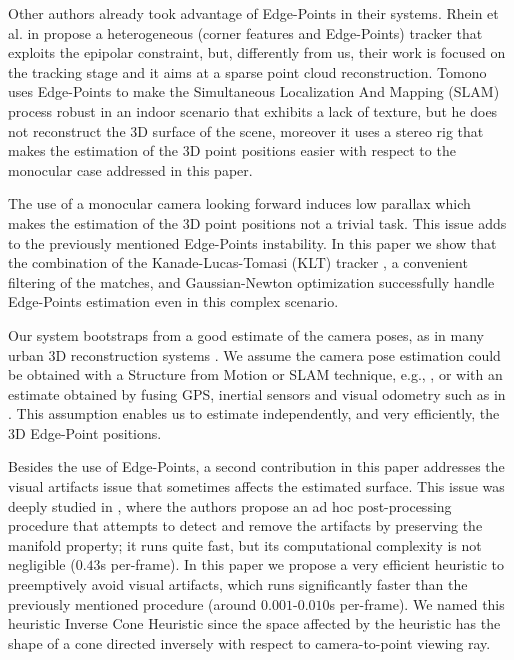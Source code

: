 Other authors \cite{Rhein_et_al13, Tomono09} already took advantage of Edge-Points in their systems. Rhein et al. in \cite{Rhein_et_al13} propose a heterogeneous (corner features and Edge-Points) tracker that exploits the epipolar constraint, but, differently from us, their work is focused on the tracking stage and it aims at a sparse point cloud reconstruction.
Tomono \cite{Tomono09}  uses Edge-Points to make  the Simultaneous Localization And Mapping (SLAM) process robust in an indoor scenario that exhibits a lack of texture, but he does not reconstruct the 3D surface of the scene, moreover it uses a stereo rig that makes the estimation of the 3D point positions easier with respect to the monocular case addressed in this paper.

The use of a monocular camera looking forward induces low parallax which makes  the estimation of the 3D point positions not a trivial task. This issue adds to the previously mentioned Edge-Points instability. 
In this paper we show that the combination of the  Kanade-Lucas-Tomasi (KLT) tracker \cite{Lucas_Kanade81}, a convenient filtering of the matches, and Gaussian-Newton optimization successfully handle Edge-Points estimation even in this complex scenario. 

Our system bootstraps from a good estimate of the camera poses, as in many urban 3D reconstruction systems \cite{ pollefeys_et_al_08, Cornelis_et_al08}. 
We assume the camera pose estimation could be obtained with a Structure from Motion or SLAM technique, e.g., \cite{Snavely_et_al06},  or with an estimate obtained by fusing GPS, inertial sensors and visual odometry such as in \cite{Cucci_Matteucci14}.
This assumption enables us to estimate independently, and very efficiently, the 3D Edge-Point positions.

Besides the use of Edge-Points, a second contribution in this paper addresses the visual artifacts issue that sometimes affects the estimated surface.
This issue was deeply studied in \cite{litvinov_Lhiuller14}, where the authors propose an ad hoc post-processing procedure that attempts to detect and remove the artifacts by preserving the manifold property; it runs quite fast, but its computational complexity is not negligible ($0.43$s per-frame).  
In this paper we propose a very efficient heuristic to preemptively avoid visual artifacts, which runs significantly faster than the previously mentioned procedure (around $0.001$-$0.010$s per-frame). We named this heuristic Inverse Cone Heuristic since the space affected by the heuristic has the shape of a cone directed inversely with respect to camera-to-point viewing ray.

